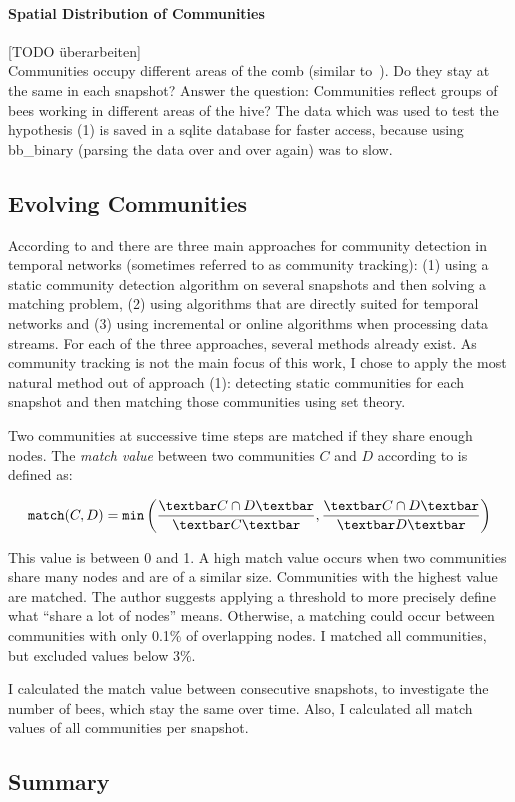 \paragraph{Spatial Distribution of Communities}
[TODO überarbeiten]\\
Communities occupy different areas of the comb (similar to~\cite{baracchi2014socio}). Do they stay at the same in each snapshot?
Answer the question: Communities reflect groups of bees working in different areas of the hive? The data which was used to test the hypothesis (1) is saved in a sqlite database for faster access, because using bb\_binary (parsing the data over and over again) was to slow.\\

\subsection{Evolving Communities}
\label{sec:bg:tracking}
According to \textcite{aynaud2013communities} and  \textcite{brodka2014community} there are three main approaches for community detection in temporal networks (sometimes referred to as community tracking): (1) using a static community detection algorithm on several snapshots and then solving a matching problem, (2) using algorithms that are directly suited for temporal networks and (3) using incremental or online algorithms when processing data streams. For each of the three approaches, several methods already exist.
As community tracking is not the main focus of this work, I chose to apply the most natural method out of approach (1): detecting static communities for each snapshot and then matching those communities using set theory.


Two communities at successive time steps are matched if they share enough nodes.
The \emph{match value} between two communities $C$ and $D$ according to \textcite{hopcroft2004tracking} is defined as:

\begin{equation}
\label{eq:match}
\texttt{match}(C,D) = \texttt{min}\left( \frac{\textbar C\cap D \textbar}{\textbar C\textbar }, \frac{\textbar C\cap D \textbar}{\textbar D \textbar }\right)
\end{equation}


This value is between 0 and 1. A high match value occurs when two communities share many nodes and are of a similar size. Communities with the highest value are matched. The author suggests applying a threshold to more precisely define what ``share a lot of nodes'' means. Otherwise, a matching could occur between communities with only 0.1\% of overlapping nodes. I matched all communities, but excluded values below 3\%.


I calculated the match value between consecutive snapshots, to investigate the number of bees, which stay the same over time. Also, I calculated all match values of all communities per snapshot.

\subsection{Summary}